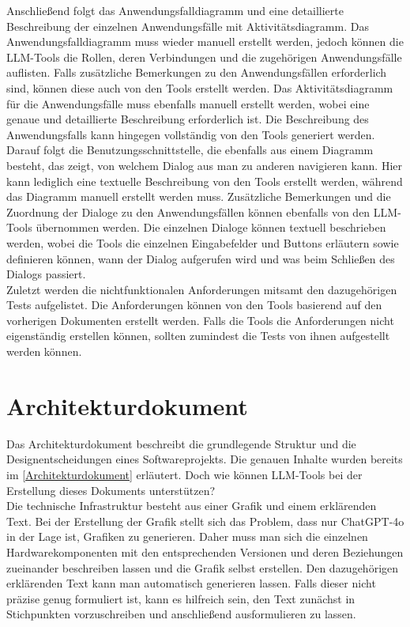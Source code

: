 Anschließend folgt das Anwendungsfalldiagramm und eine detaillierte Beschreibung der einzelnen Anwendungsfälle mit 
Aktivitätsdiagramm. Das Anwendungsfalldiagramm muss wieder manuell erstellt werden, jedoch können die LLM-Tools 
die Rollen, deren Verbindungen und die zugehörigen Anwendungsfälle auflisten. Falls zusätzliche Bemerkungen zu den 
Anwendungsfällen erforderlich sind, können diese auch von den Tools erstellt werden. Das Aktivitätsdiagramm für die 
Anwendungsfälle muss ebenfalls manuell erstellt werden, wobei eine genaue und detaillierte Beschreibung erforderlich 
ist. Die Beschreibung des Anwendungsfalls kann hingegen vollständig von den Tools generiert werden.\\

Darauf folgt die Benutzungsschnittstelle, die ebenfalls aus einem Diagramm besteht, das zeigt, von welchem Dialog aus 
man zu anderen navigieren kann. Hier kann lediglich eine textuelle Beschreibung von den Tools erstellt werden, während 
das Diagramm manuell erstellt werden muss. Zusätzliche Bemerkungen und die Zuordnung der Dialoge zu den Anwendungsfällen 
können ebenfalls von den LLM-Tools übernommen werden. Die einzelnen Dialoge können textuell beschrieben werden, wobei 
die Tools die einzelnen Eingabefelder und Buttons erläutern sowie definieren können, wann der Dialog aufgerufen wird 
und was beim Schließen des Dialogs passiert.\\

Zuletzt werden die nichtfunktionalen Anforderungen mitsamt den dazugehörigen Tests aufgelistet. Die Anforderungen 
können von den Tools basierend auf den vorherigen Dokumenten erstellt werden. Falls die Tools die Anforderungen nicht 
eigenständig erstellen können, sollten zumindest die Tests von ihnen aufgestellt werden können.

\section{Architekturdokument}  \label{LLMArchitekturdokument}

Das Architekturdokument beschreibt die grundlegende Struktur und die Designentscheidungen eines Softwareprojekts. 
Die genauen Inhalte wurden bereits im \autoref{Architekturdokument} erläutert. Doch wie können LLM-Tools bei der 
Erstellung dieses Dokuments unterstützen?\\

Die technische Infrastruktur besteht aus einer Grafik und einem erklärenden Text. Bei der Erstellung der Grafik 
stellt sich das Problem, dass nur ChatGPT-4o in der Lage ist, Grafiken zu generieren. Daher muss man sich die 
einzelnen Hardwarekomponenten mit den entsprechenden Versionen und deren Beziehungen zueinander beschreiben lassen 
und die Grafik selbst erstellen. Den dazugehörigen erklärenden Text kann man automatisch generieren lassen. Falls 
dieser nicht präzise genug formuliert ist, kann es hilfreich sein, den Text zunächst in Stichpunkten vorzuschreiben 
und anschließend ausformulieren zu lassen.\\

